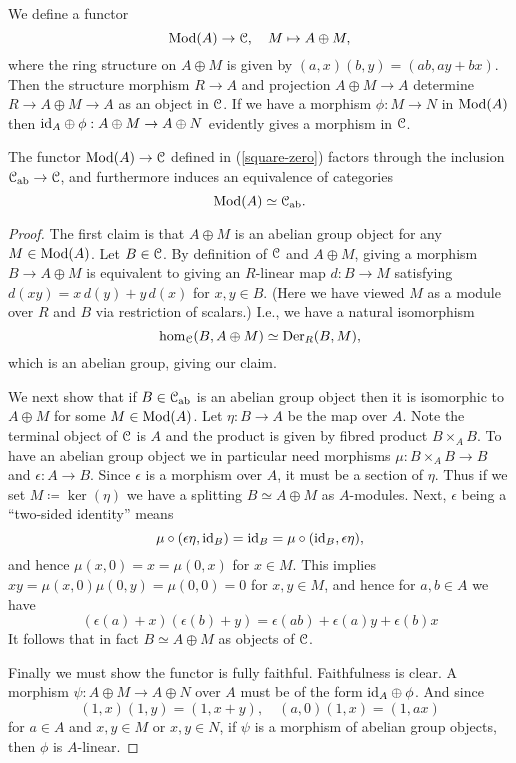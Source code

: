 \begin{nothing}
  \label{square-zero}
  We define a functor
  \[
  \mathrm{Mod}(A) \to \mathcal{C}, \quad M \mapsto A \oplus M,
  \]
  where the ring structure on $A \oplus M$ is given by $(a,x)(b,y) =
  (ab,ay+bx)$. Then the structure morphism $R \to A$ and projection $A
  \oplus M \to A$ determine $R \to A \oplus M \to A$ as an object in
  $\mathcal{C}$. If we have a morphism $\phi : M \to N$ in $\mathrm{Mod}(A)$ then
  $\mathrm{id}_A \oplus \phi : A \oplus M \to A \oplus N$ evidently gives a
  morphism in $\mathcal{C}$.
\end{nothing}

\begin{proposition}
  \label{modules-abelian}
  The functor $\mathrm{Mod}(A) \to \mathcal{C}$ defined in (\ref{square-zero}) factors
  through the inclusion $\mathcal{C}_{\operatorname{ab}} \to \mathcal{C}$, and furthermore induces an
  equivalence of categories
  \[
  \mathrm{Mod}(A) \simeq \mathcal{C}_{\operatorname{ab}}.
  \]
\end{proposition}

\begin{proof}
  The first claim is that $A \oplus M$ is an abelian group object for
  any $M \in \mathrm{Mod}(A)$. Let $B \in \mathcal{C}$. By definition of $\mathcal{C}$ and $A
  \oplus M$, giving a morphism $B \to A \oplus M$ is equivalent to
  giving an $R$-linear map $d : B \to M$ satisfying $d(xy) = x\,d(y) +
  y\,d(x)$ for $x,y \in B$. (Here we have viewed $M$ as a module over
  $R$ and $B$ via restriction of scalars.) I.e., we have a natural
  isomorphism
  \begin{equation}
    \label{sqzero-der}
    \operatorname{hom}_{\mathcal{C}}(B, A \oplus M) \simeq \operatorname{Der}_R(B,M),
  \end{equation}
  which is an abelian group, giving our claim.

  We next show that if $B \in \mathcal{C}_{\operatorname{ab}}$ is an abelian group object
  then it is isomorphic to $A \oplus M$ for some $M \in \mathrm{Mod}(A)$. Let
  $\eta : B \to A$ be the map over $A$. Note the terminal object of
  $\mathcal{C}$ is $A$ and the product is given by fibred product $B \times_A
  B$. To have an abelian group object we in particular need morphisms
  $\mu : B \times_A B \to B$ and $\epsilon : A \to B$.  Since
  $\epsilon$ is a morphism over $A$, it must be a section of
  $\eta$. Thus if we set $M \coloneqq \ker(\eta)$ we have a splitting
  $B \simeq A \oplus M$ as $A$-modules. Next, $\epsilon$ being a
  ``two-sided identity'' means
  \[
  \mu \circ (\epsilon \eta, \mathrm{id}_B) = \mathrm{id}_B = \mu \circ (\mathrm{id}_B,
  \epsilon \eta),
  \]
  and hence $\mu(x,0) = x = \mu(0,x)$ for $x \in M$. This implies $xy
  = \mu(x,0)\mu(0,y) = \mu(0,0) = 0$ for $x,y \in M$, and hence for
  $a,b \in A$ we have
  \[
  (\epsilon(a)+x)(\epsilon(b)+y) = \epsilon(ab) + \epsilon(a)y +
  \epsilon(b)x
  \]
  It follows that in fact $B \simeq A \oplus M$ as objects of $\mathcal{C}$.

  Finally we must show the functor is fully faithful. Faithfulness is
  clear. A morphism $\psi : A \oplus M \to A \oplus N$ over $A$ must
  be of the form $\mathrm{id}_A \oplus \phi$. And since
  \[
  (1,x)(1,y) = (1,x+y), \quad (a,0)(1,x) = (1,ax)
  \]
  for $a \in A$ and $x,y \in M$ or $x,y \in N$, if $\psi$ is a
  morphism of abelian group objects, then $\phi$ is $A$-linear.
\end{proof}

